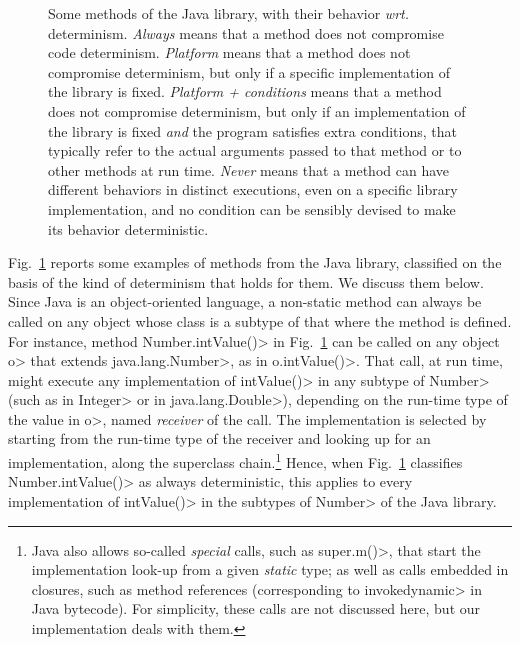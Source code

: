 \begin{figure}[t]
\begin{center}
\begin{tabular}{|l||C{1cm}|C{1.25cm}|C{1.57cm}|C{1cm}|}
    \end{tabular}
  \end{center}
  \caption{Some methods of the Java library, with their behavior \emph{wrt.} determinism.
\emph{Always} means that a method does not compromise code determinism.
\emph{Platform} means that
a method does not compromise determinism, but only if a specific implementation
of the library is fixed. \emph{Platform + conditions} means that a method
does not compromise determinism, but only if an implementation of the library is fixed
\emph{and} the program satisfies extra conditions, that typically refer to
the actual arguments passed to that method or to other methods at run time.
\emph{Never} means
that a method can have different behaviors in distinct executions,
even on a specific library implementation, and no
condition can be sensibly devised to make its behavior deterministic.}\label{fig:determinism}
\end{figure}

Fig.~\ref{fig:determinism} reports some examples of methods
from the Java library, classified
on the basis of the kind of determinism that holds for them.
We discuss them below. Since Java is an object-oriented language,
a non-static method can always be called on any object whose class
is a subtype of that where the method is defined. For instance, method \<Number.intValue()> in
Fig.~\ref{fig:determinism} can be called on any object \<o> that extends
\<java.lang.Number>, as in \<o.intValue()>. That call, at run time, might
execute any implementation of \<intValue()> in any subtype of \<Number>
(such as in \<Integer> or in \<java.lang.Double>), depending on the run-time
type of the value in \<o>, named \emph{receiver} of the call.
The implementation is selected by starting from the run-time type of the receiver
and looking up for an implementation, along the superclass
chain.\footnote{Java also allows so-called \emph{special} calls, such as
   \<super.m()>, that start the implementation look-up from a given \emph{static}
   type; as well as calls embedded in closures, such as method references
   (corresponding to \<invokedynamic> in Java bytecode). For simplicity,
   these calls are not discussed here, but our implementation deals with them.}
Hence, when Fig.~\ref{fig:determinism} classifies \<Number.intValue()> as always
deterministic, this applies to every implementation of
\<intValue()> in the subtypes of \<Number> of the Java library.

